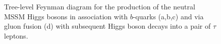 \begin{figure}[tp]
     \begin{center}
     \hspace{0.2cm}	
     	\hspace{0.2cm}	
     \end{center}
    \caption{Tree-level Feynman diagram for the production of the neutral MSSM Higgs bosons in association with  $b$-quarks (a,b,c) and via gluon fusion (d) 
	 with subsequent Higgs boson decays into a pair of $\tau$ leptons.}
   \label{fig:prod}
\end{figure}

